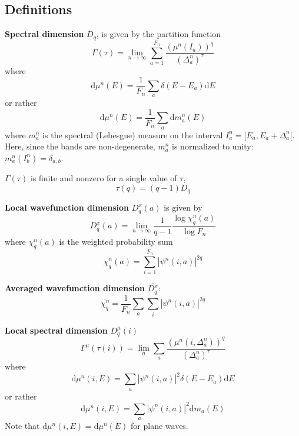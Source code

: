 \documentclass[11pt]{article}
\renewcommand{\d}[1]{\mathrm{d}#1}
\begin{document}
\subsection{Definitions}

\textbf{Spectral dimension} $\boxed{D_q}$, is given by the partition function
\begin{equation}
	\Gamma(\tau) = \lim_{n\rightarrow \infty} \sum_{a=1}^{F_n} \frac{(\mu^n(I_a))^q}{(\Delta_a^n)^\tau}
\end{equation}
where
\begin{equation}
	\d \mu^n(E) = \frac{1}{F_n}\sum_a \delta(E-E_a) \d E
\end{equation}
or rather
\begin{equation}
	\d \mu^n(E) = \frac{1}{F_n}\sum_a \d{m_a^n}(E)
\end{equation}
where $m_a^n$ is the spectral (Lebesgue) measure on the interval $I_a^n = [E_a,E_a+\Delta_a^n[$.
Here, since the bands are non-degenerate, $m_a^n$ is normalized to unity: $m_a^n(I_b^n)=\delta_{a,b}$.

$\Gamma(\tau)$ is finite and nonzero for a single value of $\tau$, 
\begin{equation}
	\tau(q) = (q-1)D_q
\end{equation}

\textbf{Local wavefunction dimension} $\boxed{D^x_q(a)}$ is given by
\begin{equation}
	D^x_q(a) = \lim_{n\rightarrow \infty} \frac{1}{q-1} \frac{\log \chi^n_q(a)}{\log F_n}
\end{equation}
where $\chi^n_q(a)$ is the weighted probability sum
\begin{equation}
	\chi^n_q(a) = \sum_{i=1}^{F_n} |\psi^n(i,a)|^{2q}
\end{equation}

\textbf{Averaged wavefunction dimension} $\boxed{\overline{D^x_q}}$:
\begin{equation}
	\overline{\chi^n_q} = \frac{1}{F_n}\sum_a \sum_i |\psi^n(i,a)|^{2q}
\end{equation}

\textbf{Local spectral dimension} $\boxed{D^\mu_q(i)}$
\begin{equation}
	\Gamma^\mu(\tau(i)) = \lim_n \sum_a \frac{\left(\mu^n(i,\Delta_a^n)\right)^q}{(\Delta_a^n)^\tau}
\end{equation}
where
\begin{equation}
	\d \mu^n(i,E) = \sum_a |\psi^n(i,a)|^2 \delta(E-E_a) \d E
\end{equation}
or rather
\begin{equation}
	\d \mu^n(i,E) = \sum_a |\psi^n(i,a)|^2 \d{m_a}(E)
\end{equation}
Note that $\d \mu^n(i,E) = \d \mu^n(E)$ for plane waves.
\end{document}
